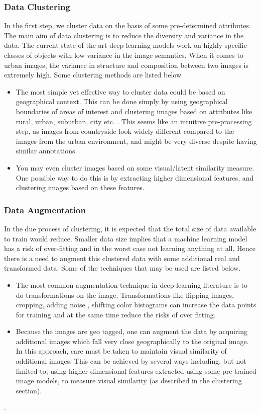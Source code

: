 \subsubsection{Data Clustering}
In the first step, we %
cluster data on the basis of some pre-determined attributes. %
The main aim of data clustering is to reduce the diversity and variance in the data. The current state of the art deep-learning models work on highly specific classes of objects with low variance in the image semantics. When it comes to urban images, the variance in structure and composition between two images is extremely high. Some clustering methods are listed below
\begin{itemize}
	\item The most simple yet effective way to cluster data could be based on geographical context. This can be done simply by using geographical boundaries of areas of interest and clustering images based on attributes like rural, urban, suburban, city etc.  . This seems like an intuitive pre-processing step, as images from countryside look widely different compared to the images from the urban environment, and might be very diverse despite having similar annotations.
	\item You may even cluster images based on some visual/latent similarity measure. One possible way to do this is by extracting higher dimensional features, and clustering images based on these features.
\end{itemize} 

 
\subsubsection{Data Augmentation}
In the due process of clustering, it is expected that the total size of data available to train would reduce. Smaller data size implies that a machine learning model has a risk of over-fitting and in the worst case not learning anything at all. Hence there is a need to augment this clustered data with some additional real and transformed data. Some of the techniques that may be used are listed below.
\begin{itemize}
	\item The most common augmentation technique in deep learning literature is to do transformations on the image. Transformations like flipping images, cropping, adding noise , shifting color histograms can increase the data points for training and at the same time reduce the risks of over fitting.
	\item Because the images are geo tagged, one can augment the data by acquiring additional images which fall very close geographically to the original image. In this approach, care must be taken to maintain visual similarity of additional images. This can be achieved by several ways including, but not limited to, using higher dimensional features extracted using some pre-trained image models, to measure visual similarity (as described in the clustering section).
\end{itemize}. 

